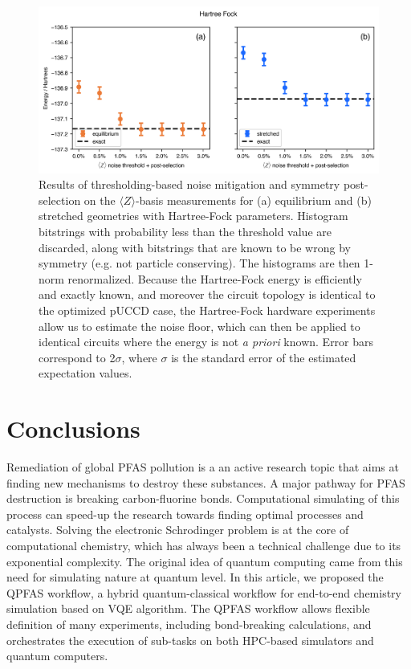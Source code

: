 \documentclass[journal,onecolumn]{IEEEtran}
\begin{document}
\begin{figure}[!htb]
\centering
\includegraphics[width=\textwidth]{hartree-fock_ch3f_noise_mitigation.png}
\caption{Results of thresholding-based noise mitigation and symmetry post-selection on the $\langle Z \rangle$-basis measurements for (a) equilibrium and (b) stretched  geometries with Hartree-Fock parameters. Histogram bitstrings with probability less than the threshold value are discarded, along with bitstrings that are known to be wrong by symmetry (e.g. not particle conserving). The histograms are then 1-norm renormalized. Because the Hartree-Fock energy is efficiently and exactly known, and moreover the circuit topology is identical to the optimized pUCCD case, the Hartree-Fock hardware experiments allow us to estimate the noise floor, which can then be applied to identical circuits where the energy is not \emph{a priori} known. Error bars correspond to 2$\sigma$, where $\sigma$ is the standard error of the estimated expectation values.}
\label{fig:hartree-fock_ch3f_noise_mitigation}
\end{figure}
\section{Conclusions}
\label{sec:conclusions_and_actions}

Remediation of global PFAS pollution is a an active research topic that aims at finding new mechanisms to destroy these substances. 
A major pathway for PFAS destruction is breaking carbon-fluorine bonds.
Computational simulating of this process can speed-up the research towards finding optimal processes and catalysts. 
Solving the electronic Schrodinger problem is at the core of computational chemistry, which has always been a technical challenge due to its exponential complexity.
The original idea of quantum computing came from this need for simulating nature at quantum level. 
%
In this article, we proposed the QPFAS workflow, a hybrid quantum-classical  workflow for end-to-end chemistry simulation based on VQE algorithm.
% 
The QPFAS workflow allows flexible definition of many experiments, including bond-breaking calculations, and orchestrates the execution of sub-tasks on both HPC-based simulators and quantum computers. 
%
\end{document}
